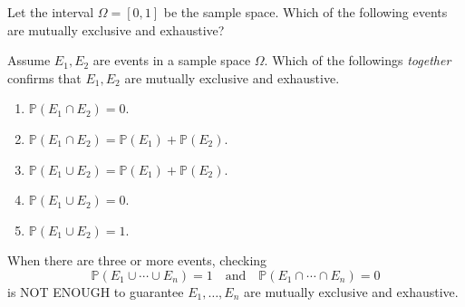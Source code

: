 \documentclass[../main.tex]{subfiles}
\begin{document}
\begin{example}
  Let the interval \(\Omega = [0,1]\) be the sample space.  Which of the following events are mutually exclusive and exhaustive?

\end{example}

\begin{example}
  Assume \(E_{1}, E_{2}\) are events in a sample space \(\Omega\).  Which of the followings \emph{together} confirms that \(E_{1}, E_{2}\) are mutually exclusive and exhaustive. 
  \begin{enumerate}[label=(\alph*)]
    \item \(\mathbb{P}(E_{1} \cap E_{2}) = 0\).
    \item \(\mathbb{P}(E_{1} \cap E_{2}) = \mathbb{P}(E_{1}) + \mathbb{P}(E_{2})\).
    \item \(\mathbb{P}(E_{1} \cup E_{2}) = \mathbb{P}(E_{1}) + \mathbb{P}(E_{2})\).
    \item \(\mathbb{P}(E_{1} \cup E_{2}) = 0\).
    \item \(\mathbb{P}(E_{1} \cup E_{2}) = 1\).
  \end{enumerate}
\end{example}


\faExclamationTriangle{} When there are three or more events, checking
\[
  \mathbb{P}(E_{1} \cup \cdots \cup E_{n}) = 1 \quad\text{and}\quad \mathbb{P}(E_{1} \cap \cdots \cap E_{n}) = 0
\]
is NOT ENOUGH to guarantee \(E_{1}, \ldots, E_{n}\) are mutually exclusive and exhaustive.
\end{document}
